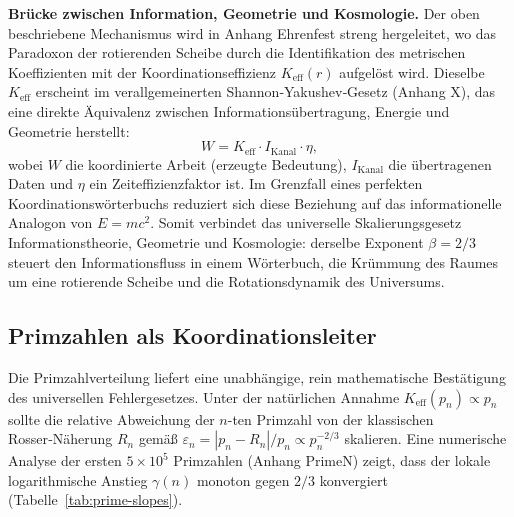 \documentclass[12pt]{article}
\begin{document}
	\textbf{Brücke zwischen Information, Geometrie und Kosmologie.}
	Der oben beschriebene Mechanismus wird in Anhang Ehrenfest streng hergeleitet, wo das Paradoxon der rotierenden Scheibe durch die Identifikation des metrischen Koeffizienten mit der Koordinationseffizienz \(K_{\mathrm{eff}}(r)\) aufgelöst wird. Dieselbe \(K_{\mathrm{eff}}\) erscheint im verallgemeinerten Shannon‑Yakushev‑Gesetz (Anhang X), das eine direkte Äquivalenz zwischen Informationsübertragung, Energie und Geometrie herstellt:
	\begin{equation}
		W = K_{\mathrm{eff}} \cdot I_{\text{Kanal}} \cdot \eta,
	\end{equation}
	wobei \(W\) die koordinierte Arbeit (erzeugte Bedeutung), \(I_{\text{Kanal}}\) die übertragenen Daten und \(\eta\) ein Zeiteffizienzfaktor ist. Im Grenzfall eines perfekten Koordinationswörterbuchs reduziert sich diese Beziehung auf das informationelle Analogon von \(E = mc^2\). Somit verbindet das universelle Skalierungsgesetz Informationstheorie, Geometrie und Kosmologie: derselbe Exponent \(\beta = 2/3\) steuert den Informationsfluss in einem Wörterbuch, die Krümmung des Raumes um eine rotierende Scheibe und die Rotationsdynamik des Universums.
	
	\subsection{Primzahlen als Koordinationsleiter}
	
	Die Primzahlverteilung liefert eine unabhängige, rein mathematische Bestätigung des universellen Fehlergesetzes. Unter der natürlichen Annahme \(K_{\mathrm{eff}}(p_n) \propto p_n\) sollte die relative Abweichung der \(n\)-ten Primzahl von der klassischen Rosser‑Näherung \(R_n\) gemäß \(\varepsilon_n = |p_n - R_n|/p_n \propto p_n^{-2/3}\) skalieren. Eine numerische Analyse der ersten \(5\times10^5\) Primzahlen (Anhang PrimeN) zeigt, dass der lokale logarithmische Anstieg \(\gamma(n)\) monoton gegen \(2/3\) konvergiert (Tabelle~\ref{tab:prime-slopes}).
	
\end{document}
